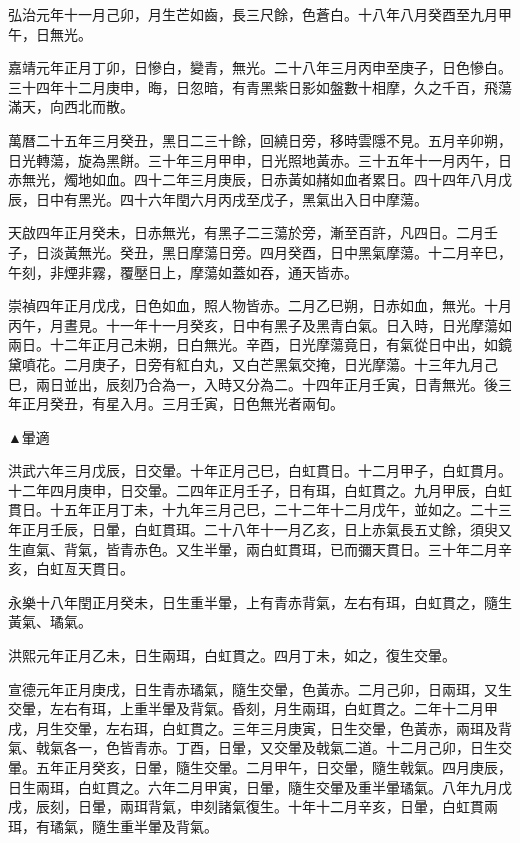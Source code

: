 \begin{pinyinscope}
弘治元年十一月己卯，月生芒如齒，長三尺餘，色蒼白。十八年八月癸酉至九月甲午，日無光。

嘉靖元年正月丁卯，日慘白，變青，無光。二十八年三月丙申至庚子，日色慘白。三十四年十二月庚申，晦，日忽暗，有青黑紫日影如盤數十相摩，久之千百，飛蕩滿天，向西北而散。

萬曆二十五年三月癸丑，黑日二三十餘，回繞日旁，移時雲隱不見。五月辛卯朔，日光轉蕩，旋為黑餅。三十年三月甲申，日光照地黃赤。三十五年十一月丙午，日赤無光，燭地如血。四十二年三月庚辰，日赤黃如赭如血者累日。四十四年八月戊辰，日中有黑光。四十六年閏六月丙戌至戊子，黑氣出入日中摩蕩。

天啟四年正月癸未，日赤無光，有黑子二三蕩於旁，漸至百許，凡四日。二月壬子，日淡黃無光。癸丑，黑日摩蕩日旁。四月癸酉，日中黑氣摩蕩。十二月辛巳，午刻，非煙非霧，覆壓日上，摩蕩如蓋如吞，通天皆赤。

崇禎四年正月戊戌，日色如血，照人物皆赤。二月乙巳朔，日赤如血，無光。十月丙午，月晝見。十一年十一月癸亥，日中有黑子及黑青白氣。日入時，日光摩蕩如兩日。十二年正月己未朔，日白無光。辛酉，日光摩蕩竟日，有氣從日中出，如鏡黛噴花。二月庚子，日旁有紅白丸，又白芒黑氣交掩，日光摩蕩。十三年九月己巳，兩日並出，辰刻乃合為一，入時又分為二。十四年正月壬寅，日青無光。後三年正月癸丑，有星入月。三月壬寅，日色無光者兩旬。

▲暈適

洪武六年三月戊辰，日交暈。十年正月己巳，白虹貫日。十二月甲子，白虹貫月。十二年四月庚申，日交暈。二四年正月壬子，日有珥，白虹貫之。九月甲辰，白虹貫日。十五年正月丁未，十九年三月己巳，二十二年十二月戊午，並如之。二十三年正月壬辰，日暈，白虹貫珥。二十八年十一月乙亥，日上赤氣長五丈餘，須臾又生直氣、背氣，皆青赤色。又生半暈，兩白虹貫珥，已而彌天貫日。三十年二月辛亥，白虹亙天貫日。

永樂十八年閏正月癸未，日生重半暈，上有青赤背氣，左右有珥，白虹貫之，隨生黃氣、璚氣。

洪熙元年正月乙未，日生兩珥，白虹貫之。四月丁未，如之，復生交暈。

宣德元年正月庚戌，日生青赤璚氣，隨生交暈，色黃赤。二月己卯，日兩珥，又生交暈，左右有珥，上重半暈及背氣。昏刻，月生兩珥，白虹貫之。二年十二月甲戌，月生交暈，左右珥，白虹貫之。三年三月庚寅，日生交暈，色黃赤，兩珥及背氣、戟氣各一，色皆青赤。丁酉，日暈，又交暈及戟氣二道。十二月己卯，日生交暈。五年正月癸亥，日暈，隨生交暈。二月甲午，日交暈，隨生戟氣。四月庚辰，日生兩珥，白虹貫之。六年二月甲寅，日暈，隨生交暈及重半暈璚氣。八年九月戊戌，辰刻，日暈，兩珥背氣，申刻諸氣復生。十年十二月辛亥，日暈，白虹貫兩珥，有璚氣，隨生重半暈及背氣。


\end{pinyinscope}
